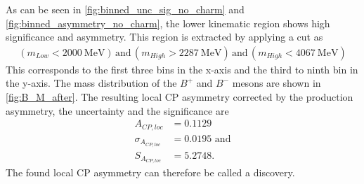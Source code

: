 As can be seen in \autoref{fig:binned_unc_sig_no_charm} and \autoref{fig:binned_asymmetry_no_charm}, the lower kinematic region shows high significance and asymmetry. This region is extracted by applying a cut as 
\begin{align*}
  (m_{Low} < \qty{2000}{\mega\electronvolt}) \, \mathrm{and} \, (m_{High} > \qty{2287}{\mega\electronvolt}) \, \mathrm{and} \, (m_{High} < \qty{4067}{\mega\electronvolt})
\end{align*}
This corresponds to the first three bins in the x-axis and the third to ninth bin in the y-axis. The mass distribution of the $B^+$ and $B^-$ mesons are shown in \autoref{fig:B_M_after}. The resulting local CP asymmetry
corrected by the production asymmetry, the uncertainty and the significance are
\begin{align*}
  A_{CP,loc} &= 0.1129\\
  \sigma_{A_{CP,loc}} &= 0.0195 \, \, \mathrm{and}\\
  S_{A_{CP,loc}} &= 5.2748.
\end{align*}
The found local CP asymmetry can therefore be called a discovery.
